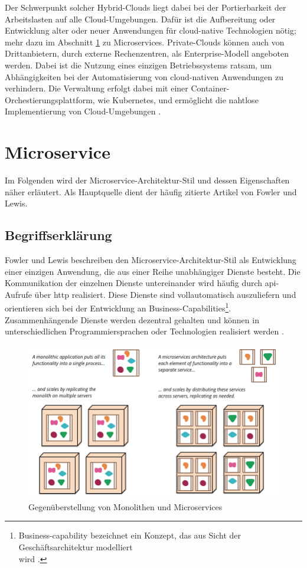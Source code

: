 Der Schwerpunkt solcher Hybrid-Clouds liegt dabei bei der Portierbarkeit der Arbeitslasten auf alle Cloud-Umgebungen.
Dafür ist die Aufbereitung oder Entwicklung alter oder neuer Anwendungen für cloud-native Technologien nötig; mehr dazu im Abschnitt \ref{Microservice} zu Microservices.
Private-Clouds können auch von Drittanbietern, durch externe Rechenzentren, als Enterprise-Modell angeboten werden. Dabei ist die Nutzung eines einzigen Betriebssystems ratsam, um Abhängigkeiten bei der Automatisierung von cloud-nativen Anwendungen zu verhindern.
Die Verwaltung erfolgt dabei mit einer Container-Orchestierungsplattform, wie Kubernetes, und ermöglicht die nahtlose Implementierung von Cloud-Umgebungen \cite{ibmHybrid}.

\section{Microservice}\label{Microservice}
Im Folgenden wird der Microservice-Architektur-Stil und dessen Eigenschaften näher erläutert.
Als Hauptquelle dient der häufig zitierte Artikel \cite{FowlerMicroservice} von Fowler und Lewis.

\subsection{Begriffserklärung}
Fowler und Lewis beschreiben den Microservice-Architektur-Stil als Entwicklung einer einzigen Anwendung, die aus einer Reihe unabhängiger Dienste besteht. 
Die Kommunikation der einzelnen Dienste untereinander wird häufig durch \acs{api}-Aufrufe über \acs{http} realisiert. 
Diese Dienste sind vollautomatisch auszuliefern und orientieren sich bei der Entwicklung an Business-Capabilities\footnote{Business-capability bezeichnet ein Konzept, das aus Sicht der Geschäftsarchitektur modelliert \\ wird \cite{MicroservicePattern}.}. 
Zusammenhängende Dienste werden dezentral gehalten und können in unterschiedlichen Programmiersprachen oder Technologien realisiert werden \cite{FowlerMicroservice}.

\begin{figure}[!htb]
  \centering
  \includegraphics[width=0.8\columnwidth]{images/MonolithsAndMicroservices.png}
  \caption{Gegenüberstellung von Monolithen und Microservices \cite{FowlerMicroservice}}
  \label{fig:monlithmicroservice}
\end{figure}

